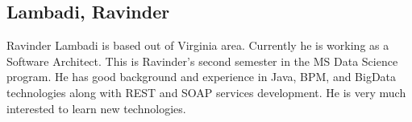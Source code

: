 
\subsection{Lambadi, Ravinder}

Ravinder Lambadi is based out of Virginia area. Currently he is working as a Software Architect. 
This is Ravinder's second semester in the MS Data Science program. He has good background and experience in Java, BPM, 
and BigData technologies along with REST and SOAP services development. He is very much interested to learn new technologies.
